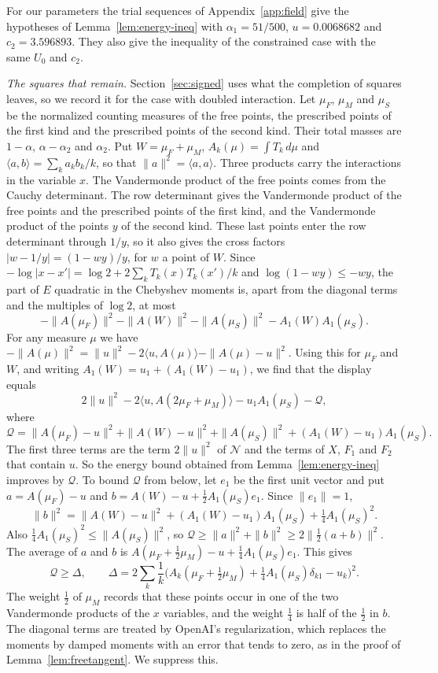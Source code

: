\documentclass[11pt]{amsart}
\newcommand{\Ctwo}{3.596893}
\newcommand{\AlphaOne}{51/500}
\theoremstyle{definition}
\theoremstyle{remark}
\numberwithin{equation}{section}
\begin{document}
For our parameters the trial sequences of Appendix~\ref{app:field} give the hypotheses of
Lemma~\ref{lem:energy-ineq} with $\alpha_1=\AlphaOne$, $u=0.0068682$ and $c_2=\Ctwo$. They also give the
inequality of the constrained case with the same $U_0$ and $c_2$.

\emph{The squares that remain.} Section~\ref{sec:signed} uses what the completion of squares leaves, so we record it for the case with doubled
interaction. Let $\mu_F$, $\mu_M$ and $\mu_S$ be the normalized counting measures of the free points, the prescribed points of the first kind and the
prescribed points of the second kind. Their total masses are $1-\alpha$, $\alpha-\alpha_2$ and $\alpha_2$. Put $W=\mu_F+\mu_M$,
$A_k(\mu)=\int T_k\,d\mu$ and $\langle a,b\rangle=\sum_ka_kb_k/k$, so that $\|a\|^2=\langle a,a\rangle$. Three products carry the interactions
in the variable $x$. The Vandermonde product of the free points comes from the Cauchy determinant. The row determinant gives the Vandermonde product of the
free points and the prescribed points of the first kind, and the Vandermonde product of the points $y$ of the second kind. These last points
enter the row determinant through $1/y$, so it also gives the cross factors $|w-1/y|=(1-wy)/y$, for $w$ a point of $W$.
Since $-\log|x-x'|=\log2+2\sum_kT_k(x)T_k(x')/k$ and $\log(1-wy)\le-wy$, the part of $E$ quadratic in the Chebyshev moments is, apart from the
diagonal terms and the multiples of $\log2$, at most
\[
 -\|A(\mu_F)\|^2-\|A(W)\|^2-\|A(\mu_S)\|^2-A_1(W)A_1(\mu_S).
\]
For any measure $\mu$ we have $-\|A(\mu)\|^2=\|u\|^2-2\langle u,A(\mu)\rangle-\|A(\mu)-u\|^2$. Using this for $\mu_F$ and $W$, and writing
$A_1(W)=u_1+(A_1(W)-u_1)$, we find that the display equals
\[
 2\|u\|^2-2\langle u,A(2\mu_F+\mu_M)\rangle-u_1A_1(\mu_S)-\mathcal Q,
\]
where
\[
 \mathcal Q=\|A(\mu_F)-u\|^2+\|A(W)-u\|^2+\|A(\mu_S)\|^2+(A_1(W)-u_1)A_1(\mu_S).
\]
The first three terms are the term $2\|u\|^2$ of $\mathcal N$ and the terms of $X$, $F_1$ and $F_2$ that contain $u$. So the energy bound obtained from
Lemma~\ref{lem:energy-ineq} improves by $\mathcal Q$. To bound $\mathcal Q$ from below, let $e_1$ be the first
unit vector and put $a=A(\mu_F)-u$ and $b=A(W)-u+\frac12A_1(\mu_S)e_1$. Since $\|e_1\|=1$,
\[
 \|b\|^2=\|A(W)-u\|^2+(A_1(W)-u_1)A_1(\mu_S)+\tfrac14A_1(\mu_S)^2 .
\]
Also $\frac14A_1(\mu_S)^2\le\|A(\mu_S)\|^2$, so $\mathcal Q\ge\|a\|^2+\|b\|^2\ge2\|\frac12(a+b)\|^2$. The average of $a$ and $b$ is
$A(\mu_F+\frac12\mu_M)-u+\frac14A_1(\mu_S)e_1$. This gives
\begin{equation}\label{eq:squares}
 \mathcal Q\ge\Delta,\qquad\Delta=2\sum_k\frac1k\bigl(A_k(\mu_F+\tfrac12\mu_M)+\tfrac14A_1(\mu_S)\delta_{k1}-u_k\bigr)^2 .
\end{equation}
The weight $\frac12$ of $\mu_M$ records that these points occur in one of the two Vandermonde products of the $x$ variables, and the weight
$\frac14$ is half of the $\frac12$ in $b$. The diagonal terms are treated by OpenAI's regularization, which replaces the moments by damped moments
with an error that tends to zero, as in the proof of Lemma~\ref{lem:freetangent}. We suppress this.
\end{document}
